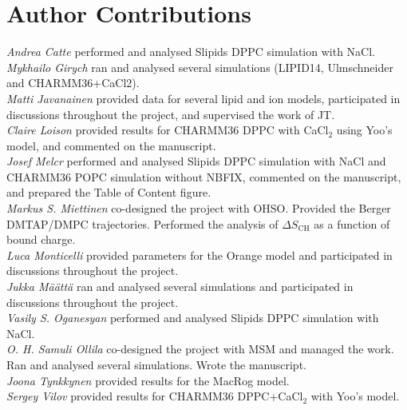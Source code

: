 \documentclass[twoside,twocolumn,9pt]{article}
\begin{document}
\section{Author Contributions}
\noindent 
{\it Andrea Catte} performed and analysed Slipids DPPC simulation with NaCl. \\
{\it Mykhailo Girych} ran and analysed several simulations (LIPID14, Ulmschneider and CHARMM36+CaCl2). \\
{\it Matti Javanainen} provided data for several lipid and ion models, participated in discussions throughout the project, and supervised the work of JT. \\
{\it Claire Loison} provided results for CHARMM36 DPPC with CaCl$_{2}$ using Yoo's model, and commented on the manuscript. \\
{\it Josef Melcr} performed and analysed Slipids DPPC simulation with NaCl and CHARMM36 POPC simulation without NBFIX, commented on the manuscript, and prepared the Table of Content figure. \\
{\it Markus S. Miettinen} co-designed the project with OHSO.  Provided the Berger DMTAP/DMPC trajectories. Performed the analysis of $\Delta S_\mathrm{CH}$ as a function of bound charge.\\
{\it Luca Monticelli} provided parameters for the Orange model and participated in discussions throughout the project. \\
{\it Jukka M{\"a}{\"a}tt{\"a}} ran and analysed several simulations and participated in discussions throughout the project. \\
{\it Vasily S. Oganesyan} performed and analysed Slipids DPPC simulation with NaCl.\\
{\it O. H. Samuli Ollila} co-designed the project with MSM and managed the work. Ran and analysed several simulations. Wrote the manuscript. \\
{\it Joona Tynkkynen } provided results for the MacRog model. \\
{\it Sergey Vilov} provided results for CHARMM36 DPPC+CaCl$_{2}$ with Yoo's model. \\


\end{document}

